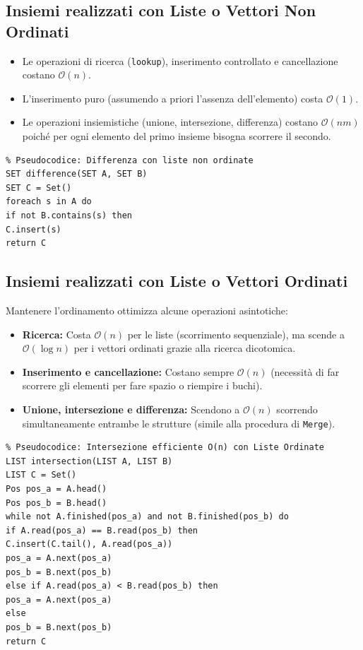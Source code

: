 \documentclass[12pt, a4paper]{article}
\begin{document}
\subsection{Insiemi realizzati con Liste o Vettori Non Ordinati}
\begin{itemize}
\item Le operazioni di ricerca (\texttt{lookup}), inserimento controllato e cancellazione costano $\mathcal{O}(n)$.
\item L'inserimento puro (assumendo a priori l'assenza dell'elemento) costa $\mathcal{O}(1)$.
\item Le operazioni insiemistiche (unione, intersezione, differenza) costano $\mathcal{O}(nm)$ poiché per ogni elemento del primo insieme bisogna scorrere il secondo.
\end{itemize}

\begin{verbatim}
% Pseudocodice: Differenza con liste non ordinate
SET difference(SET A, SET B)
SET C = Set()
foreach s in A do
if not B.contains(s) then
C.insert(s)
return C
\end{verbatim}

\subsection{Insiemi realizzati con Liste o Vettori Ordinati}
Mantenere l'ordinamento ottimizza alcune operazioni asintotiche:
\begin{itemize}
\item \textbf{Ricerca:} Costa $\mathcal{O}(n)$ per le liste (scorrimento sequenziale), ma scende a $\mathcal{O}(\log n)$ per i vettori ordinati grazie alla ricerca dicotomica.
\item \textbf{Inserimento e cancellazione:} Costano sempre $\mathcal{O}(n)$ (necessità di far scorrere gli elementi per fare spazio o riempire i buchi).
\item \textbf{Unione, intersezione e differenza:} Scendono a $\mathcal{O}(n)$ scorrendo simultaneamente entrambe le strutture (simile alla procedura di \texttt{Merge}).
\end{itemize}

\begin{verbatim}
% Pseudocodice: Intersezione efficiente O(n) con Liste Ordinate
LIST intersection(LIST A, LIST B)
LIST C = Set()
Pos pos_a = A.head()
Pos pos_b = B.head()
while not A.finished(pos_a) and not B.finished(pos_b) do
if A.read(pos_a) == B.read(pos_b) then
C.insert(C.tail(), A.read(pos_a))
pos_a = A.next(pos_a)
pos_b = B.next(pos_b)
else if A.read(pos_a) < B.read(pos_b) then
pos_a = A.next(pos_a)
else
pos_b = B.next(pos_b)
return C
\end{verbatim}
\end{document}
